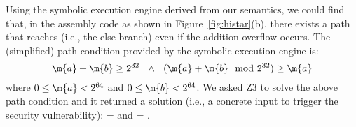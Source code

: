 Using the symbolic execution engine derived from our semantics, we could find  that, in the assembly code as shown in Figure~\ref{fig:histar}(b), there exists a path that reaches  (i.e., the else branch) even if the addition overflow occurs.
The (simplified) path condition provided by the symbolic execution engine is:
\[
\m{a} + \m{b} \ge 2^{32}
~~\wedge~~
(\m{a} + \m{b} \mod 2^{32}) \ge \m{a}
\]
where $0 \le \m{a} < 2^{64}$ and $0 \le \m{b} < 2^{64}$.
We asked Z3 to solve the above path condition and it returned a solution (i.e., a concrete input to trigger the security vulnerability):  =  and   = .



% 
% 
% 
